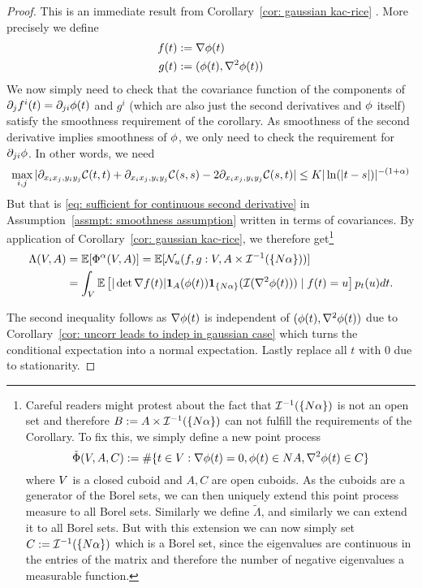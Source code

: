 \begin{proof}
	This is an immediate result from Corollary~\ref{cor: gaussian kac-rice}
	\parencite[Corollary~11.2.2]{adlerRandomFieldsGeometry2007}. More precisely
	we define
	\begin{align*}
		f(t) &:= \nabla \phi(t)\\
		g(t) &:= (\phi(t), \nabla^2 \phi(t))
	\end{align*}
	We now simply need to check that the covariance function of the components of
	\(\partial_j f^i(t) = \partial_{ji} \phi(t)\) and \(g^i\) (which are
	also just the second derivatives and \(\phi\) itself) satisfy the smoothness
	requirement of the corollary. As smoothness of the second derivative implies
	smoothness of \(\phi\), we only need to check the requirement for \(\partial_{ji} \phi\).
	In other words, we need
	\[
		\max_{i,j}|\partial_{x_i x_j, y_i y_j}\mathcal{C}(t,t)
		+ \partial_{x_i x_j, y_i y_j}\mathcal{C}(s,s)
		-2\partial_{x_i x_j, y_i y_j}\mathcal{C}(s,t)| \le K |\ln(|t-s|)|^{-(1+\alpha)}
	\]
	But that is \eqref{eq: sufficient for continuous second derivative} in
	Assumption~\ref{assmpt: smoothness assumption} written in terms of
	covariances. By application
	of Corollary~\ref{cor: gaussian kac-rice}, we therefore get\footnote{
		Careful readers might protest about the fact that \(\mathcal{I}^{-1}(\{N
		\alpha\})\) is not an open set and therefore \(B:=
		A\times\mathcal{I}^{-1}(\{N\alpha\})\) can not fulfill the requirements
		of the Corollary. To fix this, we simply define a new point process
		\[
			\tilde{\Phi}(V, A, C)
			:= \#\{t\in V: \nabla \phi(t) = 0, \phi(t)\in N A, \nabla^2\phi(t)\in C\}
		\]
		where \(V\) is a closed cuboid and \(A,C\) are open cuboids. As the cuboids
		are a generator of the Borel sets, we can then uniquely extend this point
		process measure to all Borel sets. Similarly we define \(\tilde{\Lambda}\),
		and similarly we can extend it to all Borel sets. But with this extension we
		can now simply set \(C:=\mathcal{I}^{-1}(\{N\alpha\})\) which is a Borel
		set, since the eigenvalues are continuous in the entries of the matrix and
		therefore the number of negative eigenvalues a measurable function.
	}
	\begin{align*}
		\Lambda(V, A) 
		&= \mathbb{E}[\Phi^\alpha(V, A)]
		= \mathbb{E}[\mathcal{N}_{u}(f, g: V, A\times \mathcal{I}^{-1}(\{N \alpha\}))]\\
		&= \int_V \mathbb{E}\left[
			|\det \nabla f(t)| \mathbf{1}_A(\phi(t)) \mathbf{1}_{\{N \alpha\}}(\mathcal{I}(\nabla^2\phi(t))) \mid f(t) = u
		\right] p_t(u)dt.
	\end{align*}
	
	
	The second inequality follows as \(\nabla\phi(t)\) is independent of
	\((\phi(t),\nabla^2\phi(t))\) due to Corollary~\ref{cor: uncorr leads to indep
	in gaussian case} which turns the conditional expectation into a normal
	expectation. Lastly replace all \(t\) with \(0\) due to stationarity.
\end{proof}
